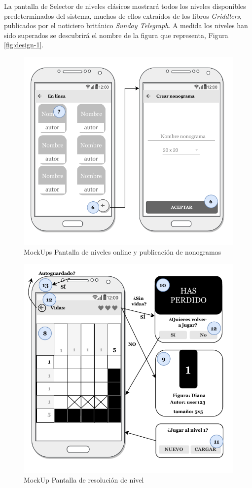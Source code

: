 La pantalla de Selector de niveles clásicos mostrará todos los niveles disponibles predeterminados del sistema,
muchos de ellos extraídos de los libros \textit{Griddlers}, publicados por el noticiero británico 
\textit{Sunday Telegraph}.
A medida los niveles han sido superados se descubrirá el nombre de la figura que representa, Figura \ref{fig:design-1}.

\begin{figure}[H]
    \centering
    \includegraphics[scale=0.83]{images/screen3.pdf}
    \caption{MockUps Pantalla de niveles online y publicación de nonogramas}
    \label{fig:design-2}
\end{figure}

\begin{figure}[H]
  \centering
  \includegraphics[scale=0.83]{images/screen4.pdf}
  \caption{MockUp Pantalla de resolución de nivel}
  \label{fig:design-3}
\end{figure}

